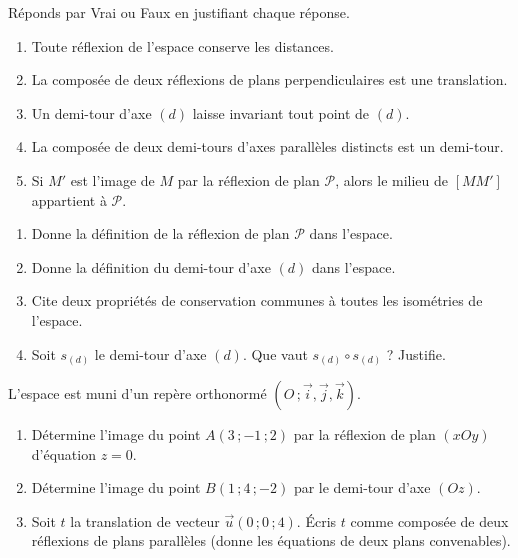 \documentclass[11pt]{article}
\newcounter{popsec}
\newcounter{popsub}
\newcommand{\courssub}[1]{%
  \stepcounter{popsub}%
  \par\vspace{9pt}\noindent{\popxbold\fontsize{11.5}{13}\selectfont\color{popink}{\color{poporange}\thepopsec.\thepopsub}\hspace{6pt}#1}\par\nopagebreak\vspace{4pt}
}
\begin{document}
\begin{exercice}
Réponds par Vrai ou Faux en justifiant chaque réponse.
\begin{enumerate}
\item Toute réflexion de l'espace conserve les distances.
\item La composée de deux réflexions de plans perpendiculaires est une translation.
\item Un demi-tour d'axe $(d)$ laisse invariant tout point de $(d)$.
\item La composée de deux demi-tours d'axes parallèles distincts est un demi-tour.
\item Si $M'$ est l'image de $M$ par la réflexion de plan $\mathcal{P}$, alors le milieu de $[MM']$ appartient à $\mathcal{P}$.
\end{enumerate}
\end{exercice}

\begin{exercice}
\begin{enumerate}
\item Donne la définition de la réflexion de plan $\mathcal{P}$ dans l'espace.
\item Donne la définition du demi-tour d'axe $(d)$ dans l'espace.
\item Cite deux propriétés de conservation communes à toutes les isométries de l'espace.
\item Soit $s_{(d)}$ le demi-tour d'axe $(d)$. Que vaut $s_{(d)} \circ s_{(d)}$ ? Justifie.
\end{enumerate}
\end{exercice}

\begin{exercice}
L'espace est muni d'un repère orthonormé $(O\,;\vec{i},\vec{j},\vec{k})$.
\begin{enumerate}
\item Détermine l'image du point $A(3\,;-1\,;2)$ par la réflexion de plan $(xOy)$ d'équation $z=0$.
\item Détermine l'image du point $B(1\,;4\,;-2)$ par le demi-tour d'axe $(Oz)$.
\item Soit $t$ la translation de vecteur $\vec{u}(0\,;0\,;4)$. Écris $t$ comme composée de deux réflexions de plans parallèles (donne les équations de deux plans convenables).
\end{enumerate}
\end{exercice}

\courssub{Je m'entraîne}
\end{document}
